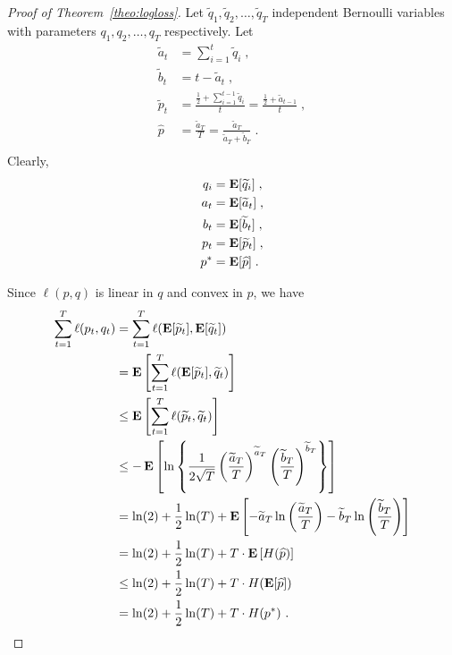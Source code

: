 \begin{proof}[Proof of Theorem~\ref{theo:logloss}]
Let $\widetilde q_1, \widetilde q_2, \dots, \widetilde q_T$ independent
Bernoulli variables with parameters $q_1, q_2, \dots, q_T$ respectively.
Let
\begin{align*}
\widetilde a_t & = \sum_{i=1}^t \widetilde q_i  \; , \\
\widetilde b_t & = t - \widetilde a_t \; , \\
\widetilde p_t & = \frac{\frac{1}{2} + \sum_{i=1}^{t-1} \widetilde q_i}{t} = \frac{\frac{1}{2} + \widetilde a_{t-1}}{t} \; , \\
\widehat p & = \frac{\widetilde a_T}{T} = \frac{\widetilde a_T}{\widetilde a_T + \widetilde b_T} \; . \\
\end{align*}
Clearly,
\begin{align*}
q_i & = \operatorname*{\mathbf{E}}[\widetilde q_i] \; , \\
a_t & = \operatorname*{\mathbf{E}}[\widetilde a_t] \; , \\
b_t & = \operatorname*{\mathbf{E}}[\widetilde b_t] \; , \\
p_t & = \operatorname*{\mathbf{E}}[\widetilde p_t] \; , \\
p^* & = \operatorname*{\mathbf{E}}[\widehat p] \; .
\end{align*}

Since $\ell(p,q)$ is linear in $q$ and convex in $p$, we have
\begin{align*}
\sum_{t=1}^T \ell(p_t, q_t)
& = \sum_{t=1}^T \ell( \operatorname*{\mathbf{E}}[ \widetilde p_t], \operatorname*{\mathbf{E}}[\widetilde q_t]) \\
& = \operatorname*{\mathbf{E}}\left[ \sum_{t=1}^T \ell( \operatorname*{\mathbf{E}}[ \widetilde p_t], \widetilde q_t) \right] \\
& \le \operatorname*{\mathbf{E}}\left[ \sum_{t=1}^T \ell( \widetilde p_t, \widetilde q_t) \right] \\
& \le - \operatorname*{\mathbf{E}}\left[ \ln \left\{ \frac{1}{2\sqrt{T}} \left( \frac{\widetilde a_T}{T} \right)^{\widetilde a_T} \left( \frac{\widetilde b_T}{T} \right)^{\widetilde b_T} \right\} \right] \\
& = \ln(2) + \frac{1}{2} \ln(T) + \operatorname*{\mathbf{E}} \left[ - \widetilde a_T \ln \left( \frac{\widetilde a_T}{T} \right) - \widetilde b_T \ln \left( \frac{\widetilde b_T}{T} \right) \right] \\
& = \ln(2) + \frac{1}{2} \ln(T) + T \cdot \operatorname*{\mathbf{E}} \left[ H(\widehat p) \right] \\
& \le \ln(2) + \frac{1}{2} \ln(T) + T \cdot H(\operatorname*{\mathbf{E}}[\widehat p]) \\
& = \ln(2) + \frac{1}{2} \ln(T) + T \cdot H(p^*)~.
\end{align*}
\end{proof}

